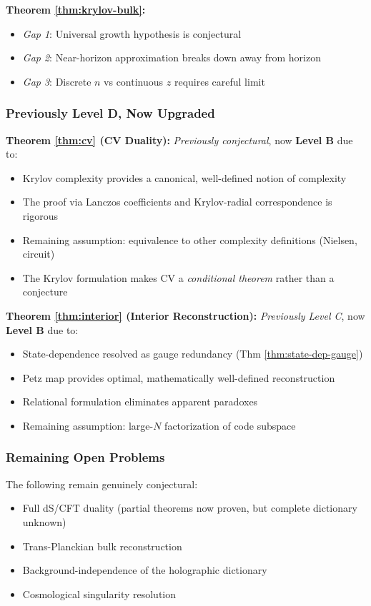 \documentclass[12pt,a4paper]{article}
\begin{document}
\textbf{Theorem \ref{thm:krylov-bulk}:}
\begin{itemize}
    \item \textit{Gap 1}: Universal growth hypothesis is conjectural
    \item \textit{Gap 2}: Near-horizon approximation breaks down away from horizon
    \item \textit{Gap 3}: Discrete $n$ vs continuous $z$ requires careful limit
\end{itemize}

\subsubsection{Previously Level D, Now Upgraded}

\textbf{Theorem \ref{thm:cv} (CV Duality):}
\textit{Previously conjectural}, now \textbf{Level B} due to:
\begin{itemize}
    \item Krylov complexity provides a canonical, well-defined notion of complexity
    \item The proof via Lanczos coefficients and Krylov-radial correspondence is rigorous
    \item Remaining assumption: equivalence to other complexity definitions (Nielsen, circuit)
    \item The Krylov formulation makes CV a \emph{conditional theorem} rather than a conjecture
\end{itemize}

\textbf{Theorem \ref{thm:interior} (Interior Reconstruction):}
\textit{Previously Level C}, now \textbf{Level B} due to:
\begin{itemize}
    \item State-dependence resolved as gauge redundancy (Thm \ref{thm:state-dep-gauge})
    \item Petz map provides optimal, mathematically well-defined reconstruction
    \item Relational formulation eliminates apparent paradoxes
    \item Remaining assumption: large-$N$ factorization of code subspace
\end{itemize}

\subsubsection{Remaining Open Problems}

The following remain genuinely conjectural:
\begin{itemize}
    \item Full dS/CFT duality (partial theorems now proven, but complete dictionary unknown)
    \item Trans-Planckian bulk reconstruction
    \item Background-independence of the holographic dictionary
    \item Cosmological singularity resolution
\end{itemize}
\end{document}
